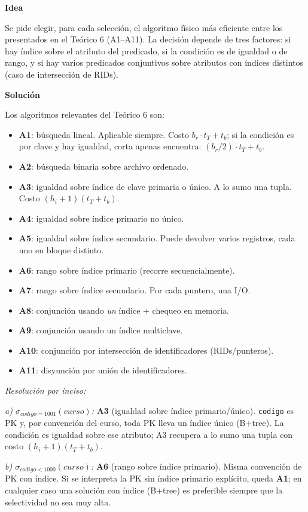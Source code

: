 \documentclass[11pt,a4paper]{article}
\newcommand{\sel}[1]{\sigma_{#1}}
\newcommand{\itemcabecera}[1]{\noindent\textbf{#1}\par\medskip}
\newcommand{\bloqueIdea}{\itemcabecera{Idea}}
\newcommand{\bloqueSolucion}{\itemcabecera{Soluci\'on}}
\begin{document}
\bloqueIdea

Se pide elegir, para cada selección, el algoritmo físico más eficiente entre los presentados en el Teórico 6 (A1--A11). La decisión depende de tres factores: si hay índice sobre el atributo del predicado, si la condición es de igualdad o de rango, y si hay varios predicados conjuntivos sobre atributos con índices distintos (caso de intersección de RIDs).

\bloqueSolucion

Los algoritmos relevantes del Teórico 6 son:

\begin{itemize}
    \item \textbf{A1}: búsqueda lineal. Aplicable siempre. Costo $b_r\cdot t_T + t_b$; si la condición es por clave y hay igualdad, corta apenas encuentra: $(b_r/2)\cdot t_T + t_b$.
    \item \textbf{A2}: búsqueda binaria sobre archivo ordenado.
    \item \textbf{A3}: igualdad sobre índice de clave primaria o único. A lo sumo una tupla. Costo $(h_i+1)(t_T+t_b)$.
    \item \textbf{A4}: igualdad sobre índice primario no único.
    \item \textbf{A5}: igualdad sobre índice secundario. Puede devolver varios registros, cada uno en bloque distinto.
    \item \textbf{A6}: rango sobre índice primario (recorre secuencialmente).
    \item \textbf{A7}: rango sobre índice secundario. Por cada puntero, una I/O.
    \item \textbf{A8}: conjunción usando \emph{un} índice + chequeo en memoria.
    \item \textbf{A9}: conjunción usando un índice multiclave.
    \item \textbf{A10}: conjunción por intersección de identificadores (RIDs/punteros).
    \item \textbf{A11}: disyunción por unión de identificadores.
\end{itemize}

\textit{Resolución por inciso:}

\textit{a) $\sel{codigo = 1001}(curso)$:} \textbf{A3} (igualdad sobre índice primario/único). \texttt{codigo} es PK y, por convención del curso, toda PK lleva un índice único (B+tree). La condición es igualdad sobre ese atributo; A3 recupera a lo sumo una tupla con costo $(h_i+1)(t_T+t_b)$.

\textit{b) $\sel{codigo < 1000}(curso)$:} \textbf{A6} (rango sobre índice primario). Misma convención de PK con índice. Si se interpreta la PK sin índice primario explícito, queda \textbf{A1}; en cualquier caso una solución con índice (B+tree) es preferible siempre que la selectividad no sea muy alta.
\end{document}
